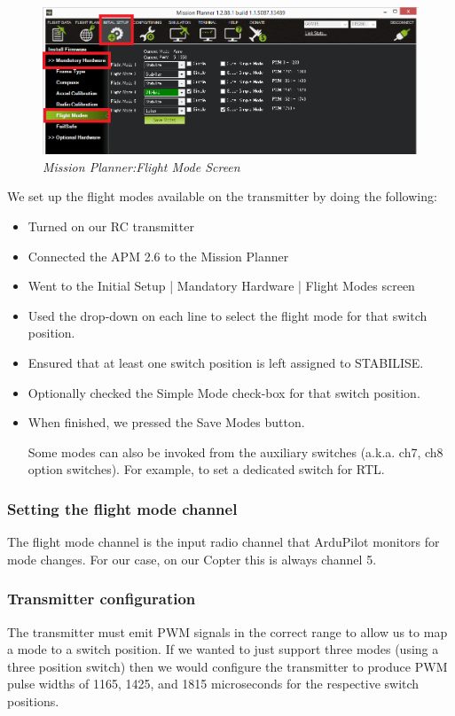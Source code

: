 \begin{figure}[h]
	\includegraphics[width=1.0\linewidth]{mp_setup_flight_mode}
	\centering
	\caption{\label{fig: mos_7}\textit{Mission Planner:Flight Mode Screen}}
	\end{figure}
We set up the flight modes available on the transmitter by doing the following:
\begin{itemize}
	\item Turned on our RC transmitter
    \item Connected the APM 2.6 to the Mission Planner
	\item Went to the Initial Setup | Mandatory Hardware | Flight Modes screen
	\item Used the drop-down on each line to select the flight mode for that switch position.
	\item Ensured that at least one switch position is left assigned to STABILISE.
	\item Optionally checked the Simple Mode check-box for that switch position. 
	\item When finished, we pressed the Save Modes button.
	
	Some modes can also be invoked from the auxiliary switches (a.k.a. ch7, ch8 option switches). For example, to set a dedicated switch for RTL.
	
	
\end{itemize}

\subsubsection{Setting the flight mode channel}
The flight mode channel is the input radio channel that ArduPilot monitors for mode changes.
For our case, on our Copter this is always channel 5.

\subsubsection{Transmitter configuration}
The transmitter must emit PWM signals in the correct range to allow us to map a mode to a switch position.
If we wanted to just support three modes (using a three position switch) then we would configure the transmitter to produce PWM pulse widths of 1165, 1425, and 1815 microseconds for the respective switch positions.

